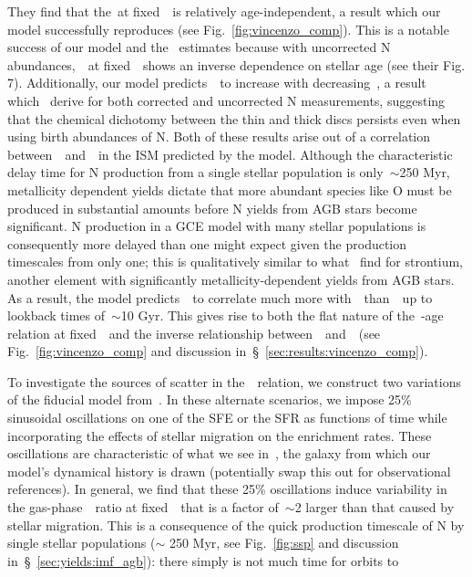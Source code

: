 \documentclass[ms.tex]{subfiles}
\begin{document}
They find that the~\no at fixed~\feh~is relatively age-independent, a result
which our model successfully reproduces (see Fig.~\ref{fig:vincenzo_comp}).
This is a notable success of our model and the~\citet{Vincenzo2021} estimates
because with uncorrected N abundances,~\no~at fixed~\feh~shows an inverse
dependence on stellar age (see their Fig. 7).
Additionally, our model predicts~\no~to increase with decreasing~\ofe, a
result which~\citet{Vincenzo2021} derive for both corrected and uncorrected
N measurements, suggesting that the chemical dichotomy between the thin and
thick discs persists even when using birth abundances of N.
Both of these results arise out of a correlation between~\nh~and~\feh~in the
ISM predicted by the model.
Although the characteristic delay time for N production from a single stellar
population is only~$\sim$250 Myr, metallicity dependent yields dictate that
more abundant species like O must be produced in substantial amounts before N
yields from AGB stars become significant.
N production in a GCE model with many stellar populations is consequently more
delayed than one might expect given the production timescales from only one;
this is qualitatively similar to what~\citet{Johnson2020} find for strontium,
another element with significantly metallicity-dependent yields from AGB stars.
As a result, the model predicts~\nh~to correlate much more with~\feh~than~\oh~up
to lookback times of~$\sim$10 Gyr.
This gives rise to both the flat nature of the~\no-age relation at
fixed~\feh~and the inverse relationship between~\no~and~\ofe~(see
Fig.~\ref{fig:vincenzo_comp} and discussion
in~\S~\ref{sec:results:vincenzo_comp}).
\par
To investigate the sources of scatter in the~\ohno~relation, we construct two
variations of the fiducial model from~\citet{Johnson2021}.
In these alternate scenarios, we impose 25\% sinusoidal oscillations on one of
the SFE or the SFR as functions of time while incorporating the effects of
stellar migration on the enrichment rates.
{\color{red}
These oscillations are characteristic of what we see in~\hsim, the galaxy from
which our model's dynamical history is drawn (potentially swap this out for
observational references).
}
In general, we find that these 25\% oscillations induce variability in the
gas-phase~\no~ratio at fixed~\oh~that is a factor of~$\sim$2 larger than that
caused by stellar migration.
This is a consequence of the quick production timescale of N by single stellar
populations ($\sim$ 250 Myr, see Fig.~\ref{fig:ssp} and discussion
in~\S~\ref{sec:yields:imf_agb}): there simply is not much time for orbits to
\end{document}
